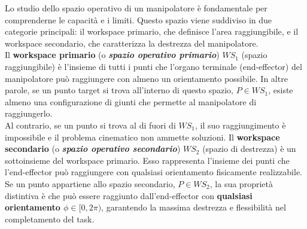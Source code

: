 \documentclass[11pt, a4paper]{article}
\begin{document}
\begin{par}
\begin{flushleft}
Lo studio dello spazio operativo di un manipolatore è fondamentale per comprenderne le capacità e i limiti. Questo spazio viene suddiviso in due categorie principali: il workspace primario, che definisce l'area raggiungibile, e il workspace secondario, che caratterizza la destrezza del manipolatore. \\
Il \textbf{workspace primario} (o \textit{\textbf{spazio operativo primario}}) $WS_1$ (spazio raggiungibile) è l'insieme di tutti i punti che l'organo terminale (end-effector) del manipolatore può raggiungere con almeno un orientamento possibile. In altre parole, se un punto target si trova all'interno di questo spazio, $P\in WS_1$, esiste almeno una configurazione di giunti che permette al manipolatore di raggiungerlo. \\
Al contrario, se un punto si trova al di fuori di $WS_1$, il suo raggiungimento è impossibile e il problema cinematico non ammette soluzioni. Il \textbf{workspace secondario} (o \textit{\textbf{spazio operativo secondario}}) $WS_2$ (spazio di destrezza) è un sottoinsieme del workspace primario. Esso rappresenta l'insieme dei punti che l'end-effector può raggiungere con qualsiasi orientamento fisicamente realizzabile. Se un punto appartiene allo spazio secondario, $P\in WS_2$, la sua proprietà distintiva è che può essere raggiunto dall'end-effector con \textbf{qualsiasi orientamento $\phi \in [0, 2\pi)$}, garantendo la massima destrezza e flessibilità nel completamento del task.
\end{flushleft}
\end{par}

\end{document}
